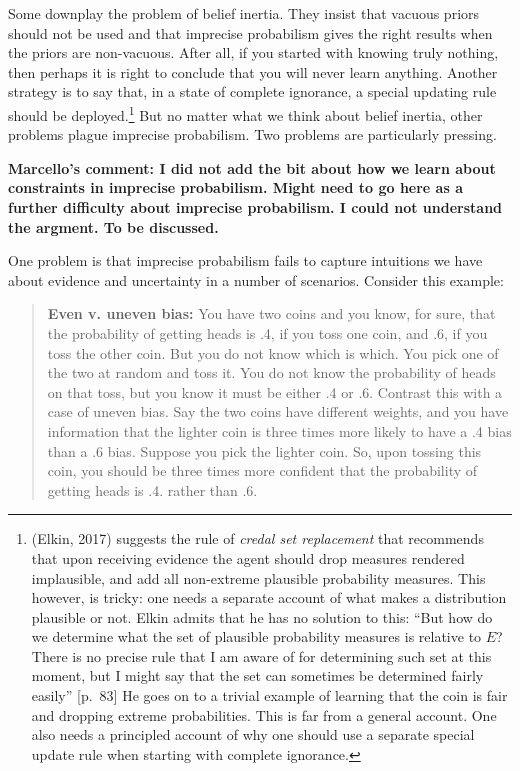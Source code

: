 \documentclass[
  10pt,
  dvipsnames,enabledeprecatedfontcommands]{scrartcl}
\begin{document}
Some downplay the problem of belief inertia. They insist that vacuous
priors should not be used and that imprecise probabilism gives the right
results when the priors are non-vacuous. After all, if you started with
knowing truly nothing, then perhaps it is right to conclude that you
will never learn anything. Another strategy is to say that, in a state
of complete ignorance, a special updating rule should be
deployed.\footnote{(Elkin, 2017) suggests the rule of
  \emph{credal set replacement} that recommends that upon receiving
  evidence the agent should drop measures rendered implausible, and add
  all non-extreme plausible probability measures. This however, is
  tricky: one needs a separate account of what makes a distribution
  plausible or not. Elkin admits that he has no solution to this: ``But
  how do we determine what the set of plausible probability measures is
  relative to \(E\)? There is no precise rule that I am aware of for
  determining such set at this moment, but I might say that the set can
  sometimes be determined fairly easily'' {[}p.~83{]} He goes on to a
  trivial example of learning that the coin is fair and dropping extreme
  probabilities. This is far from a general account. One also needs a
  principled account of why one should use a separate special update
  rule when starting with complete ignorance.} But no matter what we
think about belief inertia, other problems plague imprecise probabilism.
Two problems are particularly pressing.

\textbf{Marcello's comment: I did not add the bit about how we learn about constraints in imprecise probabilism. Might need to go here as a further difficulty about imprecise probabilism. I could not understand the argment. To be discussed.}

One problem is that imprecise probabilism fails to capture intuitions we
have about evidence and uncertainty in a number of scenarios. Consider
this example:

\begin{quote}
\textbf{Even v. uneven bias:}
 You have two coins and you know, for sure, that the probability of getting heads is .4, if you toss one coin, and .6, if you toss the other coin. But you do not know which is which. You pick one of the two at random and toss it. You do not know the probability of heads on that toss, but you know it must be either .4 or .6. Contrast this with a case of uneven bias. Say the two coins have different weights, and you have information that the lighter coin is three times more likely to have a .4 bias than a .6 bias. Suppose you pick the lighter coin. So, upon tossing this coin, you should be three times more confident that the probability of getting heads is .4. rather than .6.
\end{quote}
\end{document}
